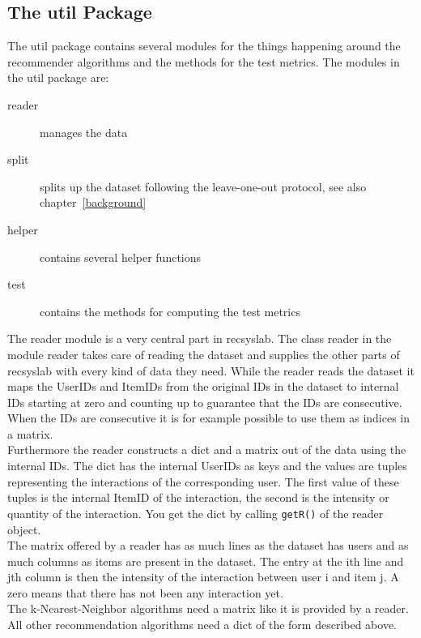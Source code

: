\subsection*{The util Package}
The util package contains several modules for the things happening around the 
recommender algorithms and the methods for the test metrics.
The modules in the util package are:
\begin{description}
\item[reader] manages the data
\item[split] splits up the dataset following the leave-one-out protocol, see also chapter~\ref{background}
\item[helper] contains several helper functions
\item[test] contains the methods for computing the test metrics
\end{description}
The reader module is a very central part in recsyslab.
The class reader in the module reader takes care of reading the dataset and 
supplies the other parts of recsyslab with every kind of data they need.
While the reader reads the dataset it maps the UserIDs and 
ItemIDs from the original IDs in the dataset to internal IDs 
starting at zero and counting up to guarantee that the IDs are consecutive. 
When the IDs are consecutive it is for example possible to use them as
indices in a matrix. \\
Furthermore the reader constructs a dict and a matrix
out of the data using the internal IDs. The dict has the internal 
UserIDs as keys and the values are tuples representing the 
interactions of the corresponding user. The first value of these tuples is the internal
ItemID of the interaction, the second is the intensity or
quantity of the interaction. You get the dict by calling \lstinline!getR()!
of the reader object. \\
The matrix offered by a reader has as much lines as the dataset
has users and as much columns as items are present in the dataset.
The entry at the ith line and jth column is then the intensity of the interaction
between user i and item j. A zero means that there has not been any
interaction yet.\\
The k-Nearest-Neighbor algorithms need a matrix like it is provided by a
reader. All other recommendation algorithms need a dict of the 
form described above.

